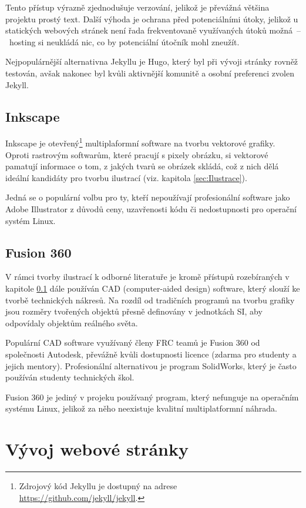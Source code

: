 \documentclass[a4paper, 12pt]{article}
\begin{document}
  Tento přístup výrazně zjednodušuje verzování, jelikož je převážná většina projektu prostý text. Další výhoda je ochrana před potenciálními útoky, jelikož u statických webových stránek není řada frekventovaně využívaných útoků možná~--~hosting si neukládá nic, co by potenciální útočník mohl zneužít.

  Nejpopulárnější alternativna Jekyllu je Hugo, který byl při vývoji stránky rovněž testován, avšak nakonec byl kvůli aktivnější komunitě a osobní preferenci zvolen Jekyll.


  \subsection{Inkscape} \label{sec:Inkscape}
  Inkscape je otevřený\footnote{Zdrojový kód Jekyllu je dostupný na adrese \url{https://github.com/jekyll/jekyll}.} multiplaformní software na tvorbu vektorové grafiky. Oproti rastrovým softwarům, které pracují s  pixely obrázku, si vektorové pamatují informace o tom, z jakých tvarů se obrázek skládá, což z nich dělá ideální kandidáty pro tvorbu ilustrací (viz. kapitola \ref{sec:Ilustrace}).

  Jedná se o populární volbu pro ty, kteří nepoužívají profesionální software jako Adobe Illustrator z důvodů ceny, uzavřenosti kódu či nedostupnosti pro operační systém Linux.


  \subsection{Fusion 360} \label{sec:Fusion 360}
  V rámci tvorby ilustrací k odborné literatuře je kromě přístupů rozebíraných v kapitole \ref{sec:Inkscape} dále používán CAD (computer-aided design) software, který slouží ke tvorbě technických nákresů. Na rozdíl od tradičních programů na tvorbu grafiky jsou rozměry tvořených objektů přesně definovány v jednotkách SI, aby odpovídaly objektům reálného světa.

  Populární CAD software využívaný členy FRC teamů je Fusion 360 od společnosti Autodesk, převážně kvůli dostupnosti licence (zdarma pro studenty a jejich mentory). Profesionální alternativou je program SolidWorks, který je často používán studenty technických škol.

  Fusion 360 je jediný v projeku používaný program, který nefunguje na operačním systému Linux,  jelikož za něho neexistuje kvalitní multiplatformní náhrada.

  \section{Vývoj webové stránky}
\end{document}

